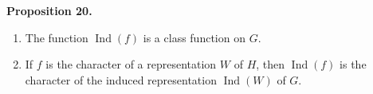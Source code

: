 \textbf{Proposition 20.}
\begin{enumerate}
  \item[(i)] The function $\operatorname{Ind}(f)$ is a class function on $G$.
  \item[(ii)] If $f$ is the character of a representation $W$ of $H$, then $\operatorname{Ind}(f)$ is the character of the induced representation $\operatorname{Ind}(W)$ of $G$.
\end{enumerate}
